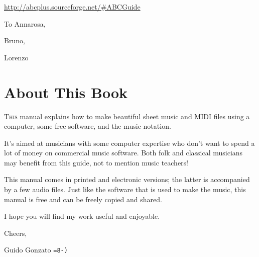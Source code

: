 \documentclass[a4paper,fullpage,12pt]{book}
\begin{document}
\url{http://abcplus.sourceforge.net/#ABCGuide}

\newpage


\thispagestyle{empty}
\null
\vfill

{\large
\begin{flushright}
\begin{itshape}
To Annarosa,

Bruno,

Lorenzo

\Heart

\end{itshape}
\end{flushright}
}

\vfill
\null
\newpage


\thispagestyle{empty} %
\setcounter{page}{4}
\pagestyle{plain}


\tableofcontents
\listoftables
\listoffigures


\chapter{About This Book}

\lettrine{T}{his} manual explains how to make beautiful sheet music
and MIDI files using a computer, some free software, and the
\ABCPLUS{} music notation.

It's aimed at musicians with some computer expertise who don't want to
spend a lot of money on commercial music software. Both folk and
classical musicians may benefit from this guide, not to mention music
teachers!

This manual comes in printed and electronic versions; the latter is
accompanied by a few audio files. Just like the software that is used
to make the music, this manual is free and can be freely copied and
shared.

I hope you will find my work useful and enjoyable.

Cheers,

\hspace{2cm}Guido Gonzato \texttt{=8-)}


\mainmatter

\pagestyle{headings}
\end{document}

